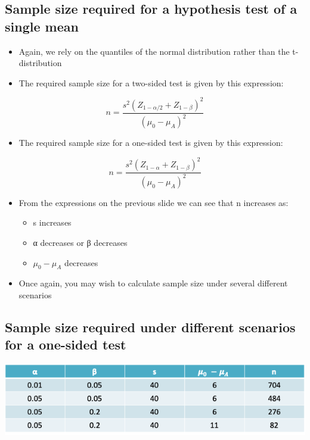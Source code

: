 \documentclass[
]{book}
\providecommand{\tightlist}{%
  \setlength{\itemsep}{0pt}\setlength{\parskip}{0pt}}
\begin{document}
\hypertarget{sample-size-required-for-a-hypothesis-test-of-a-single-mean-1}{%
\subsection{Sample size required for a hypothesis test of a single mean}\label{sample-size-required-for-a-hypothesis-test-of-a-single-mean-1}}

\begin{itemize}
\tightlist
\item
  Again, we rely on the quantiles of the normal distribution rather than the t-distribution
\item
  The required sample size for a two-sided test is given by this expression:
\end{itemize}

\[n = \frac{s^2(Z_{1-\alpha/2}+Z_{1-\beta})^2}{(\mu_0-\mu_A)^2}\]

\begin{itemize}
\tightlist
\item
  The required sample size for a one-sided test is given by this expression:
\end{itemize}

\[n = \frac{s^2(Z_{1-\alpha}+Z_{1-\beta})^2}{(\mu_0-\mu_A)^2}\]

\begin{itemize}
\tightlist
\item
  From the expressions on the previous slide we can see that n increases as:

  \begin{itemize}
  \tightlist
  \item
    s increases
  \item
    α decreases or β decreases
  \item
    \(\mu_0-\mu_A\) decreases
  \end{itemize}
\item
  Once again, you may wish to calculate sample size under several different scenarios
\end{itemize}

\hypertarget{sample-size-required-under-different-scenarios-for-a-one-sided-test}{%
\subsection{Sample size required under different scenarios for a one-sided test}\label{sample-size-required-under-different-scenarios-for-a-one-sided-test}}

\includegraphics[width=1\linewidth]{./4_58}
\end{document}
